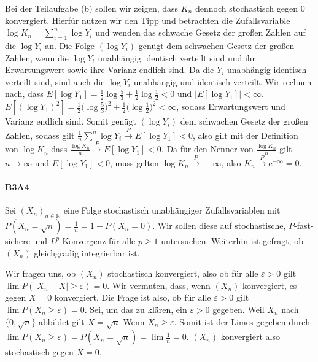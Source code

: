 \documentclass{article}
\begin{document}
Bei der Teilaufgabe (b) sollen wir zeigen, dass $K_n$ dennoch stochastisch gegen 0 konvergiert.
Hierfür nutzen wir den Tipp und betrachten die Zufallsvariable $\log K_n=\sum^n_{i=1}\log Y_i$ und wenden das schwache Gesetz der großen Zahlen auf die $\log Y_i$ an.
Die Folge $(\log Y_i)$ genügt dem schwachen Gesetz der großen Zahlen, wenn die $\log Y_i$ unabhängig identisch verteilt sind und ihr Erwartungswert sowie ihre Varianz endlich sind.
Da die $Y_i$ unabhängig identisch verteilt sind, sind auch die $\log Y_i$ unabhängig und identisch verteilt.
Wir rechnen nach, dass $E[\log Y_1]=\frac{1}{2}\log\frac{5}{3}+\frac{1}{2}\log\frac{1}{2}<0$ und $|E[\log Y_1]|<\infty$.
$E[(\log Y_1)^2]=\frac{1}{2}\bigl(\log\frac{5}{3}\bigr)^2+\frac{1}{2}\bigl(\log\frac{1}{2}\bigr)^2<\infty$, sodass Erwartungswert und Varianz endlich sind.
Somit genügt $(\log Y_i)$ dem schwachen Gesetz der großen Zahlen, sodass gilt $\frac{1}{n}\sum^n\log Y_i\xrightarrow{P}E[\log Y_1]<0$, also gilt mit der Definition von $\log K_n$ dass $\frac{\log K_n}{n}\xrightarrow{P}E[\log Y_1]<0$.
Da für den Nenner von $\frac{\log K_n}{n}$ gilt $n\to\infty$ und $E[\log Y_1]<0$, muss gelten $\log K_n\xrightarrow{P}-\infty$, also $K_n\xrightarrow{P}\mathrm{e}^{-\infty}=0$.

\newpage
\paragraph{B3A4}
Sei $(X_n)_{n\in\mathbb{N}}$ eine Folge stochastisch unabhängiger Zufallsvariablen mit $P(X_n=\sqrt{n})=\frac{1}{n}=1-P(X_n=0)$.
Wir sollen diese auf stochastische, $P$-fast-sichere und $L^p$-Konvergenz für alle $p\geq1$ untersuchen.
Weiterhin ist gefragt, ob $(X_n)$ gleichgradig integrierbar ist.

Wir fragen uns, ob $(X_n)$ stochastisch konvergiert, also ob für alle $\varepsilon>0$ gilt $\lim P(|X_n-X|\geq\varepsilon)=0$.
Wir vermuten, dass, wenn $(X_n)$ konvergiert, es gegen $X=0$ konvergiert.
Die Frage ist also, ob für alle $\varepsilon>0$ gilt $\lim P(X_n\geq\varepsilon)=0$.
Sei, um das zu klären, ein $\varepsilon>0$ gegeben.
Weil $X_n$ nach $\{0,\sqrt{n}\}$ abbildet gilt $X=\sqrt{n}$ Wenn $X_n\geq\varepsilon$.
Somit ist der Limes gegeben durch $\lim P(X_n\geq\varepsilon)=P(X_n=\sqrt{n})=\lim\frac{1}{n}=0$.
$(X_n)$ konvergiert also stochastisch gegen $X=0$.
\end{document}
